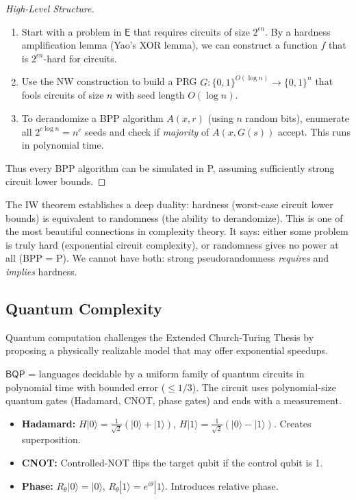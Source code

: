 \begin{proof}[High-Level Structure]
\begin{enumerate}
\item Start with a problem in $\mathsf{E}$ that requires circuits of size $2^{\epsilon n}$. By a hardness amplification lemma (Yao's XOR lemma), we can construct a function $f$ that is $2^{\epsilon n}$-hard for circuits.
\item Use the NW construction to build a PRG $G: \{0,1\}^{O(\log n)} \to \{0,1\}^n$ that fools circuits of size $n$ with seed length $O(\log n)$.
\item To derandomize a BPP algorithm $A(x, r)$ (using $n$ random bits), enumerate all $2^{c \log n} = n^c$ seeds and check if \emph{majority} of $A(x, G(s))$ accept. This runs in polynomial time.
\end{enumerate}
Thus every BPP algorithm can be simulated in P, assuming sufficiently strong circuit lower bounds.
\end{proof}

The IW theorem establishes a deep duality: hardness (worst-case circuit lower bounds) is equivalent to randomness (the ability to derandomize). This is one of the most beautiful connections in complexity theory. It says: either some problem is truly hard (exponential circuit complexity), or randomness gives no power at all (BPP = P). We cannot have both: strong pseudorandomness \emph{requires} and \emph{implies} hardness.

\subsection{Quantum Complexity}
\label{sec:complexity:quantum}

Quantum computation challenges the Extended Church-Turing Thesis by proposing a physically realizable model that may offer exponential speedups.

\begin{definition}[BQP]
$\mathsf{BQP}$ = languages decidable by a uniform family of quantum circuits in polynomial time with bounded error ($\le 1/3$). The circuit uses polynomial-size quantum gates (Hadamard, CNOT, phase gates) and ends with a measurement.
\end{definition}

\begin{definition}
\begin{itemize}
\item \textbf{Hadamard:} $H|0\rangle = \frac{1}{\sqrt{2}}(|0\rangle + |1\rangle)$, $H|1\rangle = \frac{1}{\sqrt{2}}(|0\rangle - |1\rangle)$. Creates superposition.
\item \textbf{CNOT:} Controlled-NOT flips the target qubit if the control qubit is 1.
\item \textbf{Phase:} $R_\theta|0\rangle = |0\rangle$, $R_\theta|1\rangle = e^{i\theta}|1\rangle$. Introduces relative phase.
\end{itemize}
\end{definition}

